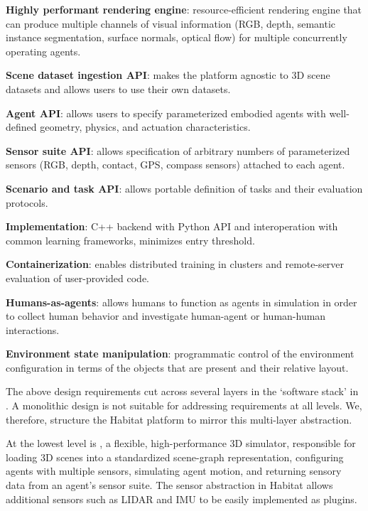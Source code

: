 \begin{compactitem}[\hspace{1pt}--]
    \item \textbf{Highly performant rendering engine}: resource-efficient rendering engine that can produce multiple channels of visual information (\eg RGB, depth, semantic instance segmentation, 
    surface normals, optical flow) for multiple concurrently operating agents.
    \item \textbf{Scene dataset ingestion API}: makes the platform agnostic to 3D scene datasets and allows users to use their own datasets. 
    \item \textbf{Agent API}: allows users to specify parameterized embodied agents with well-defined geometry, physics, and actuation characteristics. 
    \item \textbf{Sensor suite API}: allows specification of arbitrary numbers of 
    parameterized sensors (\eg RGB, depth, contact, GPS, compass sensors) attached 
    to each agent. 
    \item \textbf{Scenario and task API}: allows portable definition of tasks and their evaluation protocols.
    \item \textbf{Implementation}: C++ backend with Python API and interoperation with common learning frameworks, minimizes entry threshold.%
    \item \textbf{Containerization}: enables distributed training in clusters and remote-server evaluation of user-provided code.
    \item \textbf{Humans-as-agents}: allows humans to function as agents in simulation in order to collect human behavior and investigate human-agent or human-human interactions. 
    \item \textbf{Environment state manipulation}: programmatic control of the environment configuration in terms of the objects that are present and their relative layout. 
\end{compactitem}

The above design requirements cut across several layers in the `software stack' in .
A monolithic design is not suitable for addressing requirements at all levels. We, therefore, structure the Habitat platform to mirror this multi-layer abstraction. %


At the lowest level is
\habitatsim, a flexible, high-performance 3D simulator, 
responsible for 
loading 3D scenes into a standardized scene-graph representation, 
configuring agents with multiple sensors, simulating agent motion, and returning sensory data from an agent's sensor suite.
The sensor abstraction in Habitat allows additional sensors such as LIDAR and IMU to be easily implemented as plugins.

